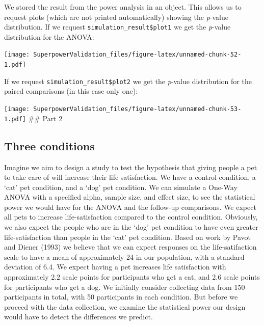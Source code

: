 \documentclass[
]{book}
\begin{document}
We stored the result from the power analysis in an object. This allows us to request plots (which are not printed automatically) showing the \emph{p}-value distribution. If we request \texttt{simulation\_result\$plot1} we get the \emph{p}-value distribution for the ANOVA:

\texttt{[image: SuperpowerValidation\_files/figure-latex/unnamed-chunk-52-1.pdf]}

If we request \texttt{simulation\_result\$plot2} we get the \emph{p}-value distribution for the paired comparisons (in this case only one):

\texttt{[image: SuperpowerValidation\_files/figure-latex/unnamed-chunk-53-1.pdf]}
\newpage
\#\# Part 2

\hypertarget{three-conditions}{%
\subsection{Three conditions}\label{three-conditions}}

Imagine we aim to design a study to test the hypothesis that giving people a pet to take care of will increase their life satisfaction. We have a control condition, a `cat' pet condition, and a `dog' pet condition. We can simulate a One-Way ANOVA with a specified alpha, sample size, and effect size, to see the statistical power we would have for the ANOVA and the follow-up comparisons. We expect all pets to increase life-satisfaction compared to the control condition. Obviously, we also expect the people who are in the `dog' pet condition to have even greater life-satisfaction than people in the `cat' pet condition. Based on work by Pavot and Diener (1993) we believe that we can expect responses on the life-satifaction scale to have a mean of approximately 24 in our population, with a standard deviation of 6.4. We expect having a pet increases life satisfaction with approximately 2.2 scale points for participants who get a cat, and 2.6 scale points for participants who get a dog. We initially consider collecting data from 150 participants in total, with 50 participants in each condition. But before we proceed with the data collection, we examine the statistical power our design would have to detect the differences we predict.
\end{document}
